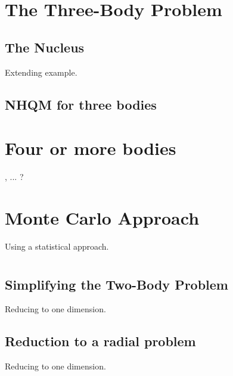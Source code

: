 \documentclass[12pt,a4paper]{report}
\begin{document}




\chapter{The Three-Body Problem} %
\label{cha:the_three_body_problem}


\section{The  Nucleus} %
\label{sec:the_^6he_nucleus}

Extending  example.


\section{NHQM for three bodies}



\chapter{Four or more bodies} %
\label{cha:four_or_more_bodies}

,  ... ?


\chapter{Monte Carlo Approach}
\label{cha:monte_carlo_approach}

Using a statistical approach.

\appendix

\chapter{}

\section{Simplifying the Two-Body Problem} %
\label{sec:the_two_body_problem}

Reducing to one dimension.


\section{Reduction to a radial problem} %
\label{sec:reduction_to_a_radial_problem}

Reducing to one dimension.

\end{document}

